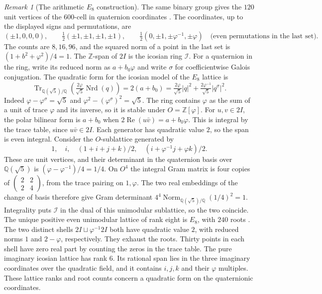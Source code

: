 \documentclass[aps,pra,onecolumn,superscriptaddress,nofootinbib,10pt]{revtex4-2}
\theoremstyle{definition}
\theoremstyle{remark}
\newtheorem{remark}[theorem]{Remark}
\begin{document}
\begin{remark}[The arithmetic $E_8$ construction]\label{gn:icosians}
The same binary group gives the $120$ unit vertices of the
$600$-cell in quaternion coordinates \cite{gn:conway}. The
coordinates, up to the displayed signs and permutations, are
\[
 (\pm1,0,0,0),\qquad
 \tfrac12(\pm1,\pm1,\pm1,\pm1),\qquad
 \tfrac12(0,\pm1,\pm\varphi^{-1},\pm\varphi)
 \quad\text{(even permutations in the last set)}.
\]
The counts are $8,16,96$, and the squared norm of a point in the
last set is $(1+b^2+\varphi^2)/4=1$. The $\mathbb Z$-span of
$2I$ is the icosian ring $\mathcal I$. For a quaternion in the ring,
write its reduced norm as $a+b_0\varphi$ and write $\sigma$ for
coefficientwise Galois conjugation. The quadratic form for the
icosian model of the $E_8$ lattice is
\[
 \operatorname{Tr}_{\mathbb Q(\sqrt5)/\mathbb Q}
   \!\left(\tfrac{2\varphi}{\sqrt5}\operatorname{Nrd}(q)\right)
 =2(a+b_0)=
 \tfrac{2\varphi}{\sqrt5}|q|^2+
 \tfrac{2\varphi^{-1}}{\sqrt5}|q^\sigma|^2 .
\]
Indeed $\varphi-\varphi^\sigma=\sqrt5$ and
$\varphi^2-(\varphi^\sigma)^2=\sqrt5$. The ring contains $\varphi$
as the sum of a unit of trace $\varphi$ and its inverse, so it is
stable under $O=\mathbb Z[\varphi]$. For $u,v\in2I$, the polar
bilinear form is $a+b_0$ when $2\operatorname{Re}(u\bar v)=a+b_0\varphi$.
This is integral by the trace table, since $u\bar v\in2I$.
Each generator has quadratic value $2$, so the span is even integral.
Consider the $O$-sublattice generated by
\[
 1,\quad i,\quad (1+i+j+k)/2,\quad (i+\varphi^{-1}j+\varphi k)/2 .
\]
These are unit vertices, and their determinant in the quaternion
basis over $\mathbb Q(\sqrt5)$ is $(\varphi-\varphi^{-1})/4=1/4$.
On $O^4$ the integral Gram matrix is four copies of
$\left(\begin{smallmatrix}2&2\\2&4\end{smallmatrix}\right)$, from the
trace pairing on $1,\varphi$. The two real embeddings of the change
of basis therefore give Gram determinant
$4^4\operatorname{Norm}_{\mathbb Q(\sqrt5)/\mathbb Q}(1/4)^2=1$.
Integrality puts $\mathcal I$ in the dual of this unimodular sublattice,
so the two coincide. The unique positive even unimodular lattice of
rank eight is $E_8$, with $240$ roots \cite[Ch.~8]{gn:conway}.
The two distinct shells $2I\sqcup\varphi^{-1}2I$ both have quadratic
value $2$, with reduced norms $1$ and $2-\varphi$, respectively.
They exhaust the roots. Thirty points in each shell have zero real part
by counting the zeros in the trace table. The pure imaginary
icosian lattice has rank $6$. Its rational span lies in the
three imaginary coordinates over the quadratic field, and it
contains $i,j,k$ and their $\varphi$ multiples. These lattice ranks and root counts concern
a quadratic form on the quaternionic coordinates.
\end{remark}
\end{document}
